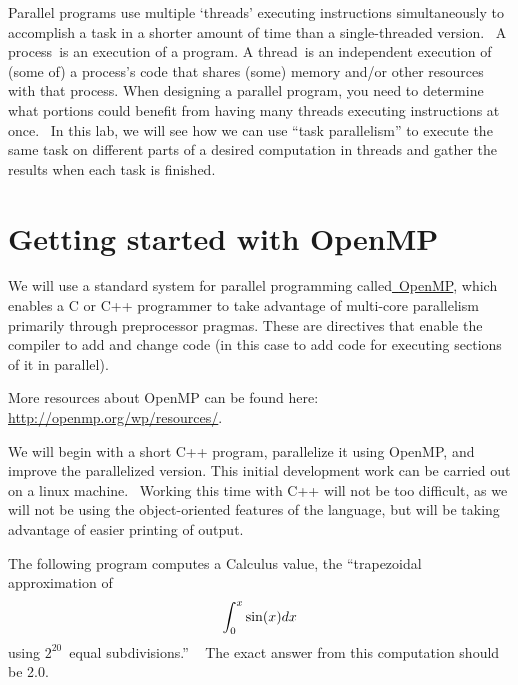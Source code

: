 \documentclass[letterpaper,10pt,openany,oneside]{sphinxmanual}
\begin{document}
Parallel programs use multiple ‘threads’ executing instructions
simultaneously to accomplish a task in a shorter amount of time than a
single-threaded version.  A process is an execution of a program. A
thread is an independent execution of (some of) a process's code that
shares (some) memory and/or other resources with that process. When
designing a parallel program, you need to determine what portions could
benefit from having many threads executing instructions at once.  In
this lab, we will see how we can use “task parallelism” to execute the
same task on different parts of a desired computation in threads and
gather the results when each task is finished.


\section{Getting started with OpenMP}
\label{introOpenMP/GettingstartedwithOpenMP:getting-started-with-openmp}
We will use a standard system for parallel programming
called\href{http://openmp.org/wp/}{ }\href{http://openmp.org/wp/}{OpenMP},
which enables a C or C++ programmer to take advantage of multi-core
parallelism primarily through preprocessor pragmas. These are directives
that enable the compiler to add and change code (in this case to add
code for executing sections of it in parallel).




More resources about OpenMP can be found here: \href{http://openmp.org/wp/resources/}{http://openmp.org/wp/resources/}.



We will begin with a short C++ program, parallelize it using OpenMP, and
improve the parallelized version. This initial development work can be
carried out on a linux machine.  Working this time with C++ will not be
too difficult, as we will not be using the object-oriented features of
the language, but will be taking advantage of easier printing of output.

The following program computes a Calculus value, the ``trapezoidal
approximation of
\begin{gather}
\begin{split}\int_0^x \sin(x) {d}{x}\end{split}\notag
\end{gather}
using $2^{20}$ equal subdivisions.”   The exact answer from this computation
should be 2.0.
\end{document}
